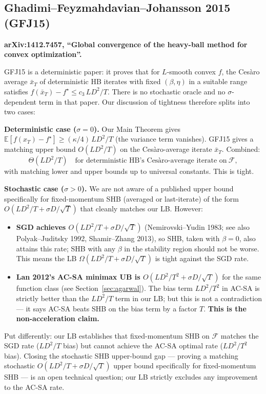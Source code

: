 \documentclass[11pt]{article}
\theoremstyle{definition}
\theoremstyle{remark}
\begin{document}
\subsection{Ghadimi--Feyzmahdavian--Johansson 2015 (GFJ15)}
\label{sec:gfj15}

\textbf{arXiv:1412.7457, ``Global convergence of the heavy-ball method for convex optimization''.}

GFJ15 is a deterministic paper: it proves that for $L$-smooth convex $f$, the Ces\`aro average $\bar x_T$ of deterministic HB iterates with fixed $(\beta,\eta)$ in a suitable range satisfies $f(\bar x_T) - f^\star \leq c_3\, LD^2/T$. There is no stochastic oracle and no $\sigma$-dependent term in that paper. Our discussion of tightness therefore splits into two cases:

\textbf{Deterministic case ($\sigma = 0$).} Our Main Theorem gives $\mathbb{E}[f(x_T) - f^\star] \geq (\kappa/4)\,LD^2/T$ (the variance term vanishes). GFJ15 gives a matching upper bound $O(LD^2/T)$ on the Ces\`aro-average iterate $\bar x_T$. Combined:
\[
  \Theta(LD^2/T)\quad \text{for deterministic HB's Ces\`aro-average iterate on}\ \mathcal{F},
\]
with matching lower and upper bounds up to universal constants. This is tight.

\textbf{Stochastic case ($\sigma > 0$).} We are not aware of a published upper bound specifically for fixed-momentum SHB (averaged or last-iterate) of the form $O(LD^2/T + \sigma D/\sqrt T)$ that cleanly matches our LB. However:
\begin{itemize}
\item \textbf{SGD achieves $O(LD^2/T + \sigma D/\sqrt T)$} (Nemirovski--Yudin 1983; see also Polyak--Juditsky 1992, Shamir--Zhang 2013), so SHB, taken with $\beta = 0$, also attains this rate; SHB with any $\beta$ in the stability region should not be worse. This means the LB $\Omega(LD^2/T + \sigma D/\sqrt T)$ is tight against the SGD rate.
\item \textbf{Lan 2012's AC-SA minimax UB is $O(LD^2/T^2 + \sigma D/\sqrt T)$} for the same function class (see Section~\ref{sec:agarwal}). The bias term $LD^2/T^2$ in AC-SA is strictly better than the $LD^2/T$ term in our LB; but this is not a contradiction --- it says AC-SA beats SHB on the bias term by a factor $T$. \textbf{This is the non-acceleration claim.}
\end{itemize}

Put differently: our LB establishes that fixed-momentum SHB on $\mathcal{F}$ matches the SGD rate ($LD^2/T$ bias) but cannot achieve the AC-SA optimal rate ($LD^2/T^2$ bias). Closing the stochastic SHB upper-bound gap --- proving a matching stochastic $O(LD^2/T + \sigma D/\sqrt T)$ upper bound specifically for fixed-momentum SHB --- is an open technical question; our LB strictly excludes any improvement to the AC-SA rate.
\end{document}
